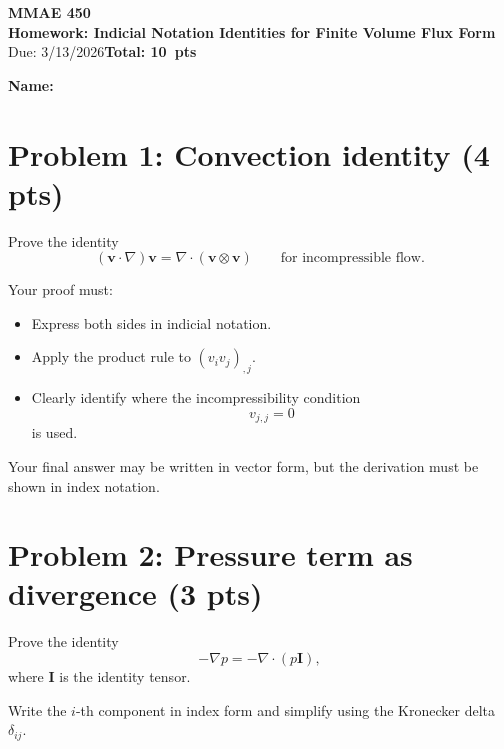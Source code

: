 \documentclass[11pt]{article}
\newcommand{\course}{MMAE 450}
\newcommand{\hwtitle}{Homework: Indicial Notation Identities for Finite Volume Flux Form}
\newcommand{\duedate}{Due: 3/13/2026}
\newcommand{\points}{10}
\begin{document}
\begin{center}
{\Large \textbf{\course}}\\[2pt]
{\large \textbf{\hwtitle}}\\[6pt]
\duedate \hfill \textbf{Total: \points\ pts}
\end{center}

\vspace{0.5em}
\noindent\textbf{Name:} \underline{\hspace{7cm}} \hfill


\vspace{1em}

\section*{Problem 1: Convection identity (4 pts)}

\noindent Prove the identity
\[
(\mathbf{v}\cdot\nabla)\mathbf{v}
=
\nabla\cdot(\mathbf{v}\otimes\mathbf{v})
\qquad \text{for incompressible flow}.
\]

\bigskip
Your proof must:

\begin{itemize}
\item Express both sides in indicial notation.
\item Apply the product rule to $(v_i v_j)_{,j}$.
\item Clearly identify where the incompressibility condition
\[
v_{j,j}=0
\]
is used.
\end{itemize}

\bigskip
Your final answer may be written in vector form, but the derivation must be
shown in index notation.

\section*{Problem 2: Pressure term as divergence (3 pts)}

\noindent Prove the identity
\[
-\nabla p = -\nabla\cdot(p\mathbf{I}),
\]
where $\mathbf{I}$ is the identity tensor.

Write the $i$-th component in index form and simplify using the Kronecker delta
$\delta_{ij}$.

\vspace{1em}
\end{document}
